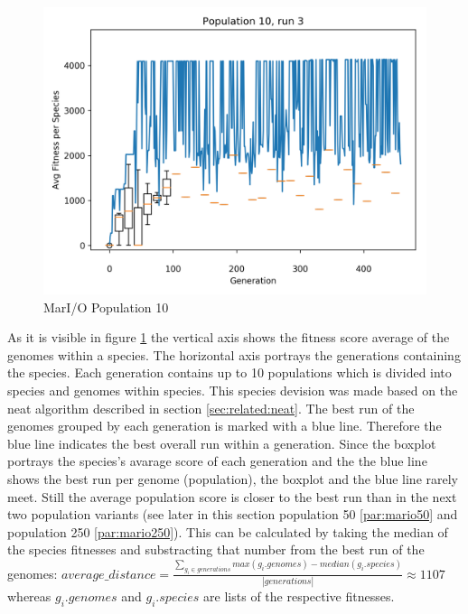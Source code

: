 \begin{figure}[h]
\begin{minipage}{0.33\textwidth}
				\end{minipage}
				\begin{minipage}{0.33\textwidth}
					\centering
					\includegraphics[width=1\textwidth]{graphics/mario/pop10_run3} %
				\end{minipage}
				\caption{MarI/O Population 10}
				\label{fig:mario10}
			\end{figure}
			As it is visible in figure \ref{fig:mario10} the vertical axis shows the fitness score average of the genomes within a species. The horizontal axis portrays the generations containing the species. Each generation contains up to 10 populations which is divided into species and genomes within species. This species devision was made based on the \gls{neat} algorithm described in section \ref{sec:related:neat}. The best run of the genomes grouped by each generation is marked with a blue line. Therefore the blue line indicates the best overall run within a generation. Since the boxplot portrays the species's avarage score of each generation and the the blue line shows the best run per genome (population), the boxplot and the blue line rarely meet. Still the average population score is closer to the best run than in the next two population variants (see later in this section population 50 \ref{par:mario50} and population 250 \ref{par:mario250}). This can be calculated by taking the median of the species fitnesses and substracting that number from the best run of the genomes:
			$average\_distance = \frac{\sum\nolimits_{g_i \in generations} max(g_i.genomes) - median(g_i.species)}{|generations|}\approx1107$ whereas $g_i.genomes$ and $g_i.species$ are lists of the respective fitnesses. \\
